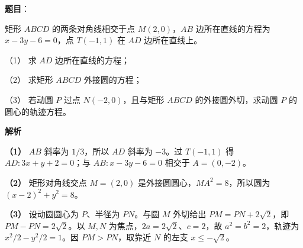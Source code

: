 \begin{answer}

\textbf{题目}：

矩形 $ABCD$ 的两条对角线相交于点 $M(2,0)$，$AB$ 边所在直线的方程为 $x-3y-6=0$，点 $T(-1,1)$ 在 $AD$ 边所在直线上。

（1） 求 $AD$ 边所在直线的方程；

（2） 求矩形 $ABCD$ 外接圆的方程；

（3） 若动圆 $P$ 过点 $N(-2,0)$，且与矩形 $ABCD$ 的外接圆外切，求动圆 $P$ 的圆心的轨迹方程。

\textbf{解析}

\textbf{（1）} $AB$ 斜率为 $1/3$，所以 $AD$ 斜率为 $-3$。过 $T(-1,1)$ 得 $AD:3x+y+2=0$；与 $AB:x-3y-6=0$ 相交于 $A=(0,-2)$。

\textbf{（2）} 矩形对角线交点 $M=(2,0)$ 是外接圆圆心，$MA^2=8$，所以圆为 $(x-2)^2+y^2=8$。

\textbf{（3）} 设动圆圆心为 $P$、半径为 $PN$。与圆 $M$ 外切给出 $PM=PN+2\sqrt2$，即 $PM-PN=2\sqrt2$。以 $M,N$ 为焦点，$2a=2\sqrt2$、$c=2$，故 $a^2=b^2=2$，轨迹为 $x^2/2-y^2/2=1$。因 $PM>PN$，取靠近 $N$ 的左支 $x\le-\sqrt2$。




\end{answer}
